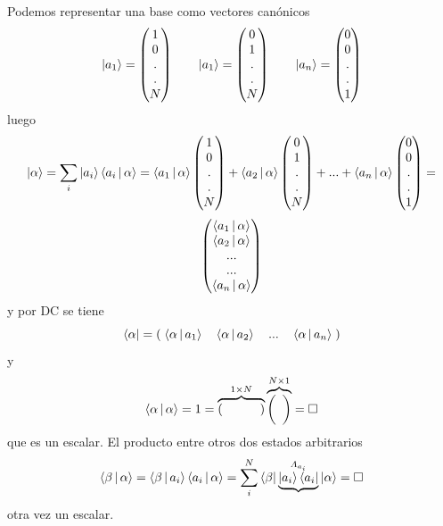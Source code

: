 \documentclass[10pt,oneside]{CBFT_book}
\begin{document}
Podemos representar una base como vectores canónicos
\[
	\Ket{a_1} = \begin{pmatrix}
			1 \\
			0 \\
			. \\
			. \\
			N
			\end{pmatrix} \qquad 
	\Ket{a_1} = \begin{pmatrix}
			0 \\
			1 \\
			. \\
			. \\
			N
			\end{pmatrix} \qquad 
	\Ket{a_n} = \begin{pmatrix}
			0 \\
			0 \\
			. \\
			. \\
			1
			\end{pmatrix}
\]
luego 
\[
	\Ket{\alpha} = \sum_i \Ket{a_i}\Braket{a_i|\alpha} =
		\Braket{a_1|\alpha} \begin{pmatrix}
			1 \\
			0 \\
			. \\
			. \\
			N
			\end{pmatrix} +
		\Braket{a_2|\alpha} \begin{pmatrix}
			0 \\
			1 \\
			. \\
			. \\
			N
			\end{pmatrix} +
			... +
		\Braket{a_n|\alpha} \begin{pmatrix}
			0 \\
			0 \\
			. \\
			. \\
			1
			\end{pmatrix} =
\]
\[
	\begin{pmatrix}
		\Braket{a_1|\alpha} \\
		\Braket{a_2|\alpha} \\
			... \\
			... \\
		\Braket{a_n|\alpha}
	\end{pmatrix}
\]
y por DC se tiene 
\[
	\Bra{\alpha} = ( \; \Braket{\alpha|a_1} \quad \Braket{\alpha|a_2} 
	\quad ... \quad \Braket{\alpha|a_n} \; )
\]
y 
\[
	\Braket{\alpha|\alpha} = 1 = \overbrace{( \phantom{1} \qquad \phantom{1} )}^{1\times 
N}\overbrace{\begin{pmatrix} \phantom{1} \\ 	\phantom{1}  \end{pmatrix} }^{N\times 1} = \Box
\]
que es un escalar.
El producto entre otros dos estados arbitrarios
\[
	\Braket{\beta|\alpha} = \Braket{\beta|a_i} \Braket{a_i|\alpha} = 
	\sum_i^N \Bra{\beta} \underbrace{\Ket{a_i} \Bra{a_i}}^{\Lambda_{a_i}} \Ket{\alpha} = \Box 
\]
otra vez un escalar.
\end{document}
